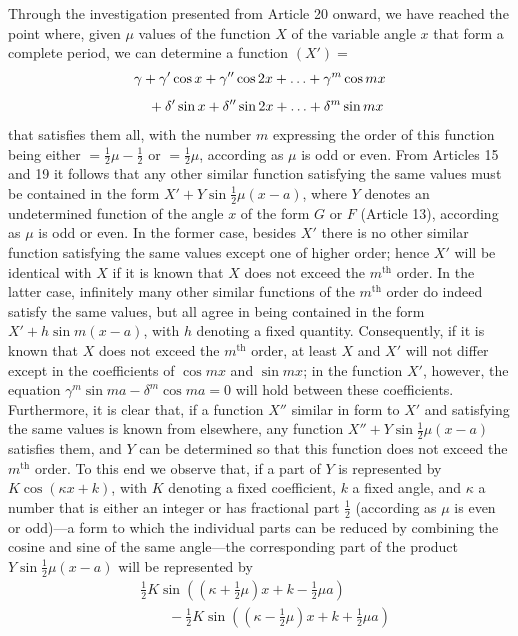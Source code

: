 \begingroup
\renewcommand{\arraystretch}{1.45}
Through the investigation presented from Article 20 onward, we have reached the point where, given $\mu$
values of the function $X$ of the variable angle $x$ that form a complete period, we can determine a function $(X')=$
\[
\begin{aligned}
&\gamma+\gamma'\cos x+\gamma''\cos2x+\mathinner{.\,.\,.}+\gamma^m\cos mx\\[5pt]
&\quad+\delta'\sin x+\delta''\sin2x+\mathinner{.\,.\,.}+\delta^m\sin mx
\end{aligned}
\]
that satisfies them all, with the number $m$ expressing the order of this function being either $=\frac12\mu-\frac12$ or $=\frac12\mu$, according as $\mu$ is odd or
even. From Articles 15 and 19 it follows that any other similar function satisfying the same values must be contained in the form $X'+Y\sin\frac12\mu(x-a)$,
where $Y$ denotes an undetermined function of the angle $x$ of the form $G$ or $F$ (Article 13), according as $\mu$ is
odd or even. In the former case, besides $X'$ there is no other similar function satisfying the same
values except one of higher order; hence $X'$ will be identical with $X$ if
it is known that $X$ does not exceed the $m^{\mathrm{th}}$ order. In the latter case, infinitely many
other similar functions of the $m^{\mathrm{th}}$ order do indeed satisfy the same values, but all agree in
being contained in the form $X'+h\sin m(x-a)$, with
$h$ denoting a fixed quantity. Consequently, if it is known that $X$ does not exceed the $m^{\mathrm{th}}$ order,
at least $X$ and $X'$ will not differ except in the coefficients of $\cos mx$ and $\sin mx$;
in the function $X'$, however, the equation
$\gamma^m\sin ma-\delta^m\cos ma=0$ will hold between these coefficients. Furthermore, it is clear that, if a function $X''$ similar in form to $X'$ and satisfying the same values is known from elsewhere, any function $X''+Y\sin\frac12\mu(x-a)$ satisfies them, and $Y$ can be determined so that this function does not exceed the $m^{\mathrm{th}}$ order. To this end we observe that, if a part of $Y$ is represented by $K\cos(\kappa x+k)$, with $K$
denoting a fixed coefficient, $k$ a fixed angle, and $\kappa$ a number that is either an integer or has fractional part
$\frac12$ (according as $\mu$ is even or odd)---a form to which the individual parts can be reduced by combining the cosine and sine of the same angle---the corresponding part of the product $Y\sin\frac12\mu(x-a)$ will be represented by
\[
\begin{aligned}
&\frac12K\sin((\kappa+\frac12\mu)x+k-\frac12\mu a)\\[5pt]&\qquad{}-\frac12K\sin((\kappa-\frac12\mu)x+k+\frac12\mu a)
\end{aligned}
\]
